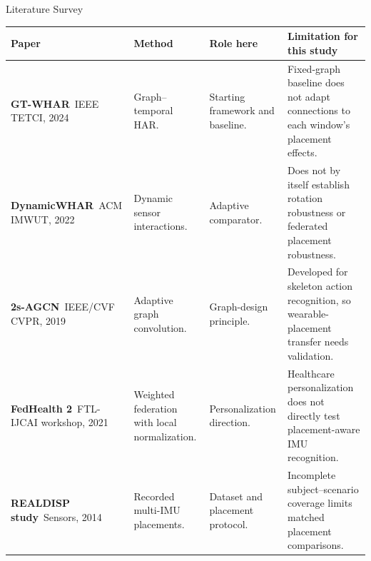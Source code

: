 \documentclass[10pt,aspectratio=169]{beamer}
\begin{document}
\begin{frame}[t]{Literature Survey}
\scriptsize
\setlength{\tabcolsep}{2.5pt}
\renewcommand{\arraystretch}{1.25}
\begin{tabularx}{\textwidth}{|P{0.20\textwidth}|P{0.17\textwidth}|P{0.23\textwidth}|Y|}
\hline
{}
\textbf{Paper} & \textbf{Method} & \textbf{Role here} & \textbf{Limitation for this study} \\
\hline
\textbf{GT-WHAR}~\cite{gtwhar}\newline IEEE TETCI, 2024 & Graph--temporal HAR. & Starting framework and baseline. & Fixed-graph baseline does not adapt connections to each window's placement effects. \\
\hline
\textbf{DynamicWHAR}~\cite{dynamicwhar}\newline ACM IMWUT, 2022 & Dynamic sensor interactions. & Adaptive comparator. & Does not by itself establish rotation robustness or federated placement robustness. \\
\hline
\textbf{2s-AGCN}~\cite{agcn}\newline IEEE/CVF CVPR, 2019 & Adaptive graph convolution. & Graph-design principle. & Developed for skeleton action recognition, so wearable-placement transfer needs validation. \\
\hline
\textbf{FedHealth 2}~\cite{fedhealth}\newline FTL-IJCAI workshop, 2021 & Weighted federation with local normalization. & Personalization direction. & Healthcare personalization does not directly test placement-aware IMU recognition. \\
\hline
\textbf{REALDISP study}~\cite{banos}\newline Sensors, 2014 & Recorded multi-IMU placements. & Dataset and placement protocol. & Incomplete subject--scenario coverage limits matched placement comparisons. \\
\hline
\end{tabularx}
\end{frame}
\end{document}
